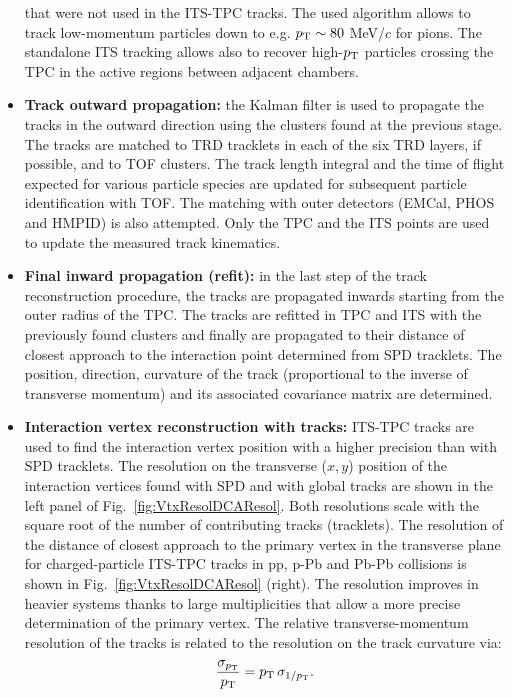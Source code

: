 \begin{itemize}
that were not used in the ITS-TPC tracks. The used algorithm allows to track low-momentum particles 
down to e.g. $p_{\rm T} \sim 80$ MeV/$c$ for pions. The standalone ITS tracking allows also to recover
high-$p_{\rm T}$ particles crossing the TPC in the active regions between adjacent chambers.
\item{\bf Track outward propagation:} the Kalman filter is used to propagate the tracks 
in the outward direction using the clusters found at the previous stage. 
The tracks are matched to TRD tracklets
in each of the six TRD layers, if possible, and to TOF clusters. The track length integral 
and the time of flight expected for various particle species are updated for 
subsequent particle identification with TOF. The matching with outer detectors (EMCal, PHOS and HMPID)
is also attempted. Only the TPC and the ITS points are used to update the measured track kinematics.
\item{\bf Final inward propagation (refit):} in the last step of the track reconstruction procedure, 
the tracks are propagated inwards starting from the outer radius of the TPC. 
The tracks are refitted in TPC and ITS with the previously found clusters and finally are propagated
to their distance of closest approach to the interaction point determined from SPD tracklets. 
The position, direction, curvature of the track (proportional to the inverse of transverse momentum)
and its associated covariance matrix are determined.  
\item{\bf Interaction vertex reconstruction with tracks:} ITS-TPC tracks are used to find the interaction vertex position 
with a higher precision than with SPD tracklets. The resolution on the transverse ($x,y$) position of the interaction vertices 
found with SPD and with global tracks are shown in the left panel of Fig.~\ref{fig:VtxResolDCAResol}. 
Both resolutions scale with the square root of the number of contributing tracks (tracklets).
The resolution of the distance of closest approach to the 
primary vertex in the transverse plane for charged-particle ITS-TPC tracks in pp, p-Pb and Pb-Pb collisions is shown in Fig.~\ref{fig:VtxResolDCAResol} (right). 
The resolution improves in heavier systems thanks to large multiplicities that allow a more precise 
determination of the primary vertex. The relative transverse-momentum resolution of the tracks is related to the
resolution on the track curvature via:
\begin{equation}
\label{eq:ptResol}
\frac{\sigma_{p_{\rm T}}}{p_{\rm T}} = p_{\rm T} \, \sigma_{1/p_{\rm T}}.
\end{equation}

\end{itemize}
